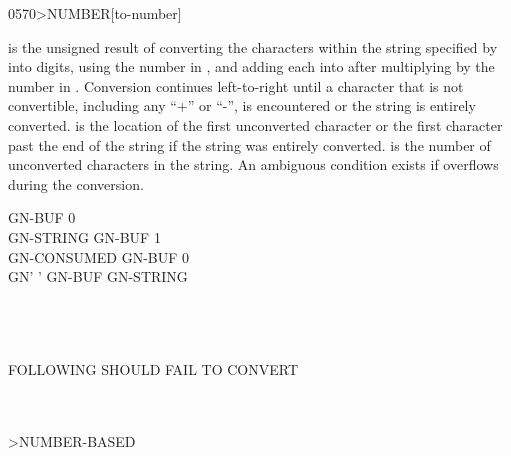 \begin{worddef}[toNUMBER]{0570}{>NUMBER}[to-number]
\item {}

	 is the unsigned result of converting the characters
	within the string specified by  into digits,
	using the number in , and adding each into 
	after multiplying  by the number in .
	Conversion continues left-to-right until a character that is not
	convertible, including any ``+'' or ``-'', is encountered or the
	string is entirely converted.
	 is the location of the first unconverted character
	or the first character past the end of the string if the string was
	entirely converted.  is the number of unconverted
	characters in the string. An ambiguous condition exists if
	 overflows during the conversion.


	\begin{testing} %
		\ttfamily
		 GN-BUF 0  \\
		\word{:} GN-STRING	 GN-BUF 1 \word{;} \\
		\word{:} GN-CONSUMED GN-BUF  0 \word{;} \\
		\word{:} GN'		 \word{[CHAR]} '    GN-BUF   GN-STRING \word{;}

		 \\
		 \\
		 \\
		 FOLLOWING SHOULD FAIL TO CONVERT \\
		 \\
		 \\

		\word{:} >NUMBER-BASED \\
		\tab {}    \word{!}    \word{!} \word{;}

		 \\
		 \\
		 \\
		 \\
		 \\


\end{testing}
\end{worddef}
